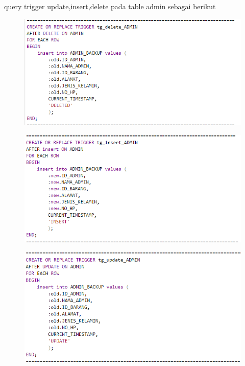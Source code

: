 \documentclass{article}
\begin{document}
\par query trigger update,insert,delete pada table admin sebagai berikut
\begin{figure}[h]
\includegraphics[scale=0.3]{img/13.PNG}
\end{figure}
\begin{figure}[h]
\includegraphics[scale=0.3]{img/14.PNG}
\end{figure}
\begin{figure}[h]
\includegraphics[scale=0.3]{img/15.PNG}
\end{figure}
\\
\\
\\
\\
\\
\\
\\
\\
\\
\\
\end{document}
